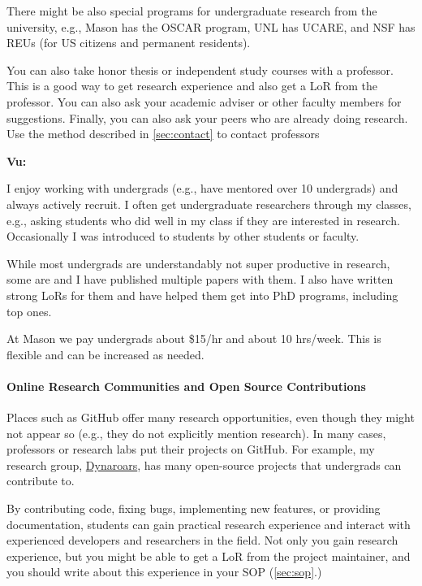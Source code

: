 \documentclass[oneside,11pt,dvipsnames]{book}
\newenvironment{commentbox}[1][]{
  \small
  \begin{mybox}
    {\small \textbf{#1}}
  }{
  \end{mybox}
}
\begin{document}
There might be also special programs for undergraduate research from the university, e.g., Mason has the OSCAR program, UNL has UCARE, and NSF has REUs (for US citizens and permanent residents).

You can also take honor thesis or independent study courses with a professor.  This is a good way to get research experience and also get a LoR from the professor.  You can also ask your academic adviser or other faculty members for suggestions.  Finally, you can also ask your peers who are already doing research.  Use the method described in \autoref{sec:contact} to contact professors


\begin{commentbox}[Vu:]
    I enjoy working with undergrads (e.g., have mentored over 10 undergrads) and always actively recruit.
    I often get undergraduate researchers through my classes, e.g., asking students who did well in my class if they are interested in research.  Occasionally I was introduced to students by other students or faculty.

    While most undergrads are understandably not super productive in research, some are and I have published multiple papers with them.  I also have written strong LoRs for them and have helped them get into PhD programs, including top ones.

    \tcblower
    At Mason we pay undergrads about \$15/hr and about 10 hrs/week. This is flexible and can be increased as needed.
\end{commentbox}

\paragraph{Online Research Communities and Open Source Contributions} Places such as GitHub offer many research opportunities, even though they might not appear so (e.g., they do not explicitly mention research).
In many cases, professors or research labs put their projects on GitHub. For example, my research group, \href{https://github.com/dynaroars/}{Dynaroars}, has many open-source projects that undergrads can contribute to.

By contributing code, fixing bugs, implementing new features, or providing documentation, students can gain practical research experience and interact with experienced developers and researchers in the field. Not only you gain research experience, but you might be able to get a LoR from the project maintainer, and you should write about this experience in your SOP (\autoref{sec:sop}.)
\end{document}
